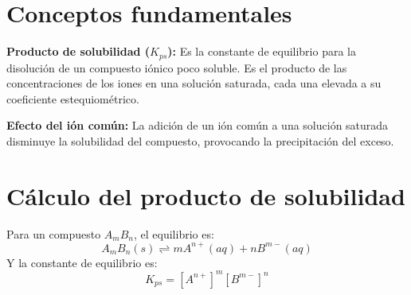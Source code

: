 \section{Conceptos fundamentales}

\textbf{Producto de solubilidad ($K_{ps}$):} Es la constante de equilibrio para la disolución de un compuesto iónico poco soluble. Es el producto de las concentraciones de los iones en una solución saturada, cada una elevada a su coeficiente estequiométrico.

\textbf{Efecto del ión común:} La adición de un ión común a una solución saturada disminuye la solubilidad del compuesto, provocando la precipitación del exceso.


\section{Cálculo del producto de solubilidad}

Para un compuesto $A_mB_n$, el equilibrio es:
\[
A_mB_n (s) \rightleftharpoons m A^{n+} (aq) + n B^{m-} (aq)
\]
Y la constante de equilibrio es:
\[
K_{ps} = [A^{n+}]^m [B^{m-}]^n
\]


